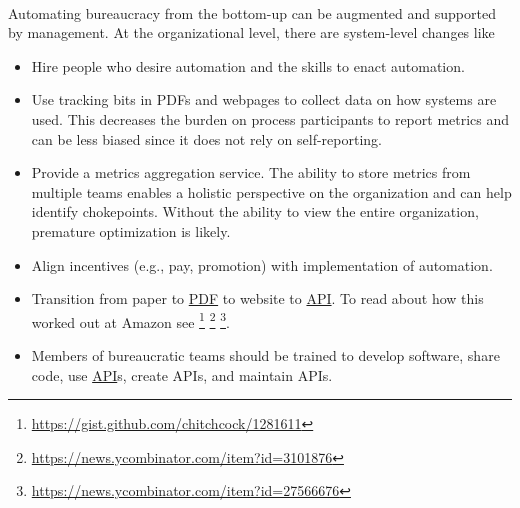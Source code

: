 \ \\
Automating bureaucracy from the bottom-up can be augmented and supported by management. 
At the organizational level, there are system-level changes like
\begin{itemize}
    \item Hire people who desire automation and the skills to enact automation.
    \item Use tracking bits in PDFs and webpages to collect data on how systems are used. This decreases the burden on process participants to report metrics and can be less biased since it does not rely on self-reporting.
    \item Provide a metrics aggregation service. The ability to store metrics from multiple teams enables a holistic perspective on the organization and can help identify chokepoints. Without the ability to view the entire organization, premature optimization is likely.
    \item Align incentives (e.g., pay, promotion) with implementation of automation.
    \item Transition from paper to \href{https://en.wikipedia.org/wiki/PDF}{PDF} to website to \href{https://en.wikipedia.org/wiki/API}{API}. To read about how this worked out at Amazon see \footnote{\href{https://gist.github.com/chitchcock/1281611}{https://gist.github.com/chitchcock/1281611}}
    \footnote{\href{https://news.ycombinator.com/item?id=3101876}{https://news.ycombinator.com/item?id=3101876}}
    \footnote{\href{https://news.ycombinator.com/item?id=27566676}{https://news.ycombinator.com/item?id=27566676}}.
    \item Members of bureaucratic teams should be trained to develop software, share code, use \href{https://en.wikipedia.org/wiki/API}{API}s, create APIs, and maintain APIs.
\end{itemize}
